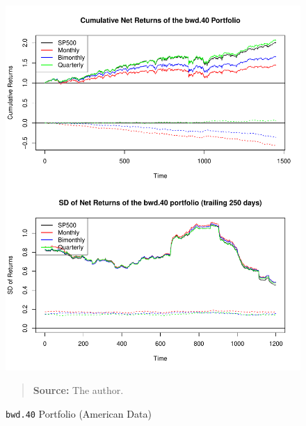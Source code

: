 \documentclass[preprint, doubleblind, authoryear,10pt]{elsarticle}
\begin{document}
\begin{figure}[htpb]
\centering
\footnotesize
\caption{\texttt{bwd.40} Portfolio (American Data)}
\label{fig:spy:bwd.40}
\includegraphics[width=.95\linewidth]{./figs/SP500-retac-bwd-40.pdf}
\begin{quote}
\textbf{Source:} The author.
\end{quote}
\end{figure}
\end{document}
